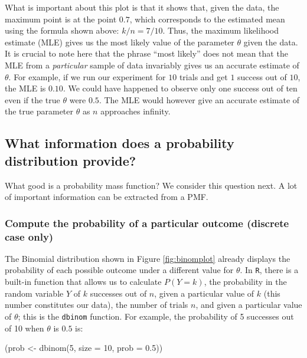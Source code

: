 \documentclass[
  12pt,
]{krantz}
\newenvironment{Shaded}{\begin{snugshade}}{\end{snugshade}}
\newcommand{\AttributeTok}[1]{\textcolor[rgb]{0.77,0.63,0.00}{#1}}
\newcommand{\DecValTok}[1]{\textcolor[rgb]{0.00,0.00,0.81}{#1}}
\newcommand{\FloatTok}[1]{\textcolor[rgb]{0.00,0.00,0.81}{#1}}
\newcommand{\FunctionTok}[1]{\textcolor[rgb]{0.00,0.00,0.00}{#1}}
\newcommand{\NormalTok}[1]{#1}
\newcommand{\OtherTok}[1]{\textcolor[rgb]{0.56,0.35,0.01}{#1}}
\theoremstyle{definition}
\theoremstyle{definition}
\theoremstyle{definition}
\theoremstyle{definition}
\theoremstyle{remark}
\begin{document}
What is important about this plot is that it shows that, given the data, the maximum point is at the point \(0.7\), which corresponds to the estimated mean using the formula shown above: \(k/n = 7/10\). Thus, the maximum likelihood estimate (MLE) gives us the most likely value of the parameter \(\theta\) given the data. It is crucial to note here that the phrase ``most likely'' does not mean that the MLE from a \emph{particular} sample of data invariably gives us an accurate estimate of \(\theta\). For example, if we run our experiment for \(10\) trials and get \(1\) success out of \(10\), the MLE is \(0.10\). We could have happened to observe only one success out of ten even if the true \(\theta\) were \(0.5\). The MLE would however give an accurate estimate of the true parameter \(\theta\) as \(n\) approaches infinity.

\hypertarget{what-information-does-a-probability-distribution-provide}{%
\subsection{What information does a probability distribution provide?}\label{what-information-does-a-probability-distribution-provide}}

What good is a probability mass function? We consider this question next. A lot of important information can be extracted from a PMF.

\hypertarget{compute-the-probability-of-a-particular-outcome-discrete-case-only}{%
\subsubsection{Compute the probability of a particular outcome (discrete case only)}\label{compute-the-probability-of-a-particular-outcome-discrete-case-only}}

The Binomial distribution shown in Figure \ref{fig:binomplot} already displays the probability of each possible outcome under a different value for \(\theta\). In \texttt{R}, there is a built-in function that allows us to calculate \(P(Y=k)\), the probability in the random variable \(Y\) of \(k\) successes out of \(n\), given a particular value of \(k\) (this number constitutes our data), the number of trials \(n\), and given a particular value of \(\theta\); this is the \texttt{dbinom} function. For example, the probability of 5 successes out of 10 when \(\theta\) is \(0.5\) is:

\begin{Shaded}
\begin{Highlighting}[]
\NormalTok{(prob }\OtherTok{\textless{}{-}} \FunctionTok{dbinom}\NormalTok{(}\DecValTok{5}\NormalTok{, }\AttributeTok{size =} \DecValTok{10}\NormalTok{, }\AttributeTok{prob =} \FloatTok{0.5}\NormalTok{))}
\end{Highlighting}
\end{Shaded}
\end{document}
